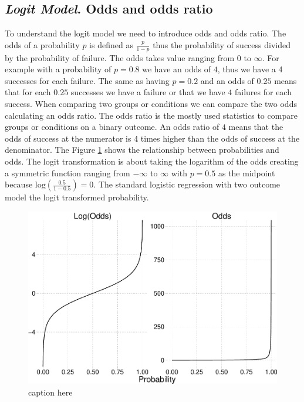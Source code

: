 \documentclass[
  man,floatsintext]{apa6}
\begin{document}
\subsection{\texorpdfstring{\emph{Logit Model}. Odds and odds ratio}{Logit Model. Odds and odds ratio}}\label{logit-model.-odds-and-odds-ratio}

To understand the logit model we need to introduce odds and odds ratio. The odds of a probability \(p\) is defined as \(\frac{p}{1 - p}\) thus the probability of success divided by the probability of failure. The odds takes value ranging from 0 to \(\infty\). For example with a probability of \(p = 0.8\) we have an odds of \(4\), thus we have a 4 successes for each failure. The same as having \(p = 0.2\) and an odds of \(0.25\) means that for each \(0.25\) successes we have a failure or that we have \(4\) failures for each success. When comparing two groups or conditions we can compare the two odds calculating an odds ratio. The odds ratio is the mostly used statistics to compare groups or conditions on a binary outcome. An odds ratio of \(4\) means that the odds of success at the numerator is 4 times higher than the odds of success at the denominator. The Figure \ref{fig:fig-odds-example} shows the relationship between probabilities and odds. The logit transformation is about taking the logarithm of the odds creating a symmetric function ranging from \(-\infty\) to \(\infty\) with \(p = 0.5\) as the midpoint because \(\text{log}(\frac{0.5}{1 - 0.5}) = 0\). The standard logistic regression with two outcome model the logit transformed probability.

\scriptsize

\begin{figure}

{\centering \includegraphics{paper-new_files/figure-latex/fig-odds-example-1} 

}

\caption{caption here}\label{fig:fig-odds-example}
\end{figure}
\end{document}
